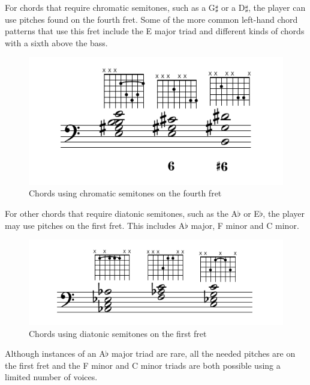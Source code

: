 For chords that require chromatic semitones, such as a G$\sharp$ or a D$\sharp$, the
player can use pitches found on the fourth fret.  Some of the more common left-hand chord
patterns that use this fret include the E major triad and different kinds of chords with a
sixth above the bass.
\begin{figure}[h]
\centering
\includegraphics{examples/g-sharp.pdf}
\caption{Chords using chromatic semitones on the fourth fret}
\label{fourth-fret-chords}
\end{figure}
For other chords that require diatonic semitones, such as the A$\flat$ or E$\flat$, the
player may use pitches on the first fret.  This includes A$\flat$ major, F minor and C
minor.
\begin{figure}[h]
\centering
\includegraphics{examples/a-flat.pdf}
\caption{Chords using diatonic semitones on the first fret}
\label{first-fret-chords}
\end{figure}
Although instances of an A$\flat$ major triad are rare, all the needed pitches are on
the first fret and the F minor and C minor triads are both possible using a limited
number of voices.


